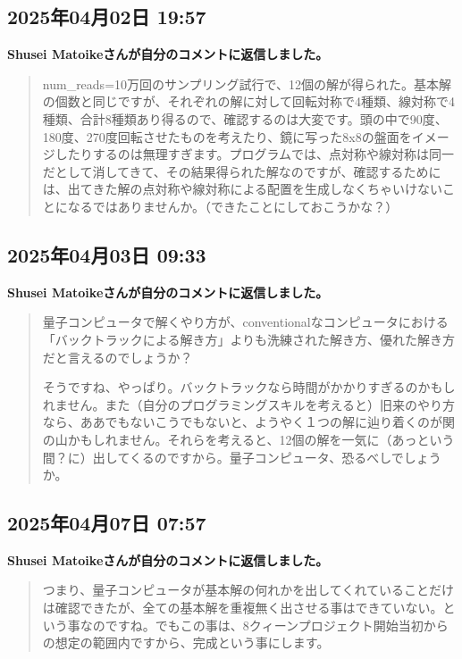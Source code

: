 \subsection*{2025年04月02日 19:57}

\textbf{Shusei Matoikeさんが自分のコメントに返信しました。}

\begin{quote}
num\_reads=10万回のサンプリング試行で、12個の解が得られた。基本解の個数と同じですが、それぞれの解に対して回転対称で4種類、線対称で4種類、合計8種類あり得るので、確認するのは大変です。頭の中で90度、180度、270度回転させたものを考えたり、鏡に写った8x8の盤面をイメージしたりするのは無理すぎます。プログラムでは、点対称や線対称は同一だとして消してきて、その結果得られた解なのですが、確認するためには、出てきた解の点対称や線対称による配置を生成しなくちゃいけないことになるではありませんか。（できたことにしておこうかな？）
\end{quote}

\subsection*{2025年04月03日 09:33}

\textbf{Shusei Matoikeさんが自分のコメントに返信しました。}

\begin{quote}
量子コンピュータで解くやり方が、conventionalなコンピュータにおける「バックトラックによる解き方」よりも洗練された解き方、優れた解き方だと言えるのでしょうか？

そうですね、やっぱり。バックトラックなら時間がかかりすぎるのかもしれません。また（自分のプログラミングスキルを考えると）旧来のやり方なら、ああでもないこうでもないと、ようやく１つの解に辿り着くのが関の山かもしれません。それらを考えると、12個の解を一気に（あっという間？に）出してくるのですから。量子コンピュータ、恐るべしでしょうか。
\end{quote}

\subsection*{2025年04月07日 07:57}

\textbf{Shusei Matoikeさんが自分のコメントに返信しました。}

\begin{quote}
つまり、量子コンピュータが基本解の何れかを出してくれていることだけは確認できたが、全ての基本解を重複無く出させる事はできていない。という事なのですね。でもこの事は、8クィーンプロジェクト開始当初からの想定の範囲内ですから、完成という事にします。
\end{quote}

